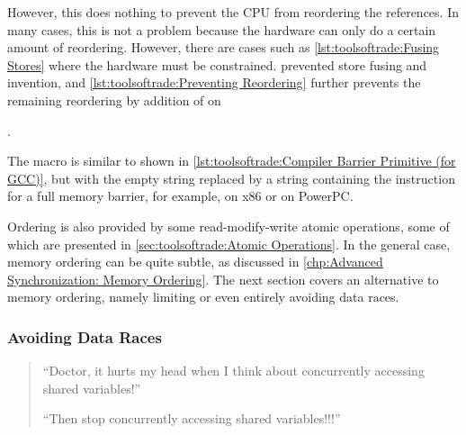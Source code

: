 However, this does nothing to prevent the CPU from reordering the
references.
In many cases, this is not a problem because the hardware can only do
a certain amount of reordering.
However, there are cases such as
\cref{lst:toolsoftrade:Fusing Stores} where the
hardware must be constrained.
prevented store fusing and invention, and
\cref{lst:toolsoftrade:Preventing Reordering}
further prevents the remaining reordering by addition of
 on
\begin{fcvref}
.
\end{fcvref}
The  macro is similar to  shown in
\cref{lst:toolsoftrade:Compiler Barrier Primitive (for GCC)},
but with the empty string replaced by a string containing the
instruction for a full memory barrier, for example, 
on x86 or  on PowerPC.

\QuickQuizEnd

Ordering is also provided by some read-modify-write atomic
operations, some of which are presented in
\cref{sec:toolsoftrade:Atomic Operations}.
In the general case, memory ordering can be quite subtle, as
discussed in
\cref{chp:Advanced Synchronization: Memory Ordering}.
The next section covers an alternative to memory ordering, namely
limiting or even entirely avoiding data races.

\subsubsection{Avoiding Data Races}
\label{sec:toolsoftrade:Avoiding Data Races}

\begin{quote}
``Doctor, it hurts my head when I think about concurrently accessing
shared variables!''

``Then stop concurrently accessing shared variables!!!''
\end{quote}

